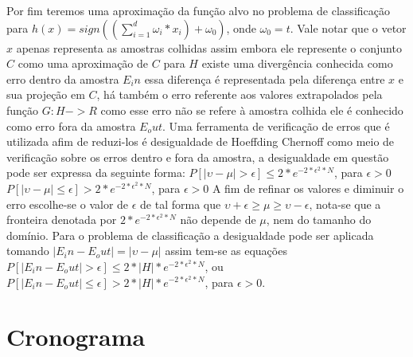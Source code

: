 \documentclass[pfc]{imetex}
\begin{document}
    Por fim teremos uma aproximação da função alvo no problema de classificação para $h(x) = sign((\sum\limits_{i=1}^d \omega_i*x_i)+\omega_0)$, onde $\omega_0 = t$.
    \newline
    Vale notar que o vetor $x$ apenas representa as amostras colhidas assim embora ele represente o conjunto $C$ como uma aproximação de $C$ para $H$ existe uma divergência conhecida como erro dentro da amostra $E_in$ essa diferença é representada pela diferença entre $x$ e sua projeção em $C$, há também o erro referente aos valores extrapolados pela função $G: H -> R$ como esse erro não se refere à amostra colhida ele é conhecido como erro fora da amostra $E_out$.
    \newline
    Uma ferramenta de verificação de erros que é utilizada afim de reduzi-los é desigualdade de Hoeffding Chernoff como meio de verificação sobre os erros dentro e fora da amostra, a desigualdade em questão pode ser expressa da seguinte forma:
    \newline
    $P[|\upsilon - \mu|>\epsilon] \leq 2*e^{-2*\epsilon^2*N}$, para $\epsilon>0$
    \newline
    $P[|\upsilon - \mu|\leq\epsilon] > 2*e^{-2*\epsilon^2*N}$, para $\epsilon>0$
    \newline
    A fim de refinar os valores e diminuir o erro escolhe-se o valor de $\epsilon$ de tal forma que $\upsilon + \epsilon \geq \mu \geq \upsilon - \epsilon$, nota-se que a fronteira denotada por $2*e^{-2*\epsilon^2*N}$ não depende de $\mu$, nem do tamanho do domínio.
    \newline
    Para o problema de classificação a desigualdade pode ser aplicada tomando $|E_in-E_out|=|\upsilon-\mu|$ assim tem-se as equações 
    $P[|E_in-E_out|>\epsilon] \leq 2*|H|*e^{-2*\epsilon^2*N}$, ou 
    $P[|E_in-E_out|\leq\epsilon] > 2*|H|*e^{-2*\epsilon^2*N}$, para $\epsilon>0$.

\section{Cronograma}
\end{document}
